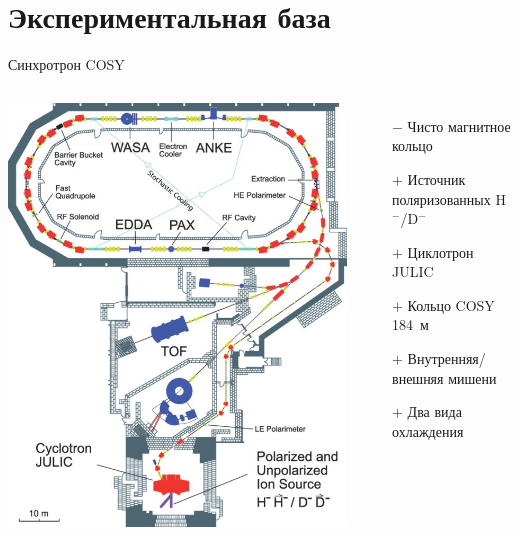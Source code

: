 \documentclass[14pt]{beamer}
\begin{document}
\section{Экспериментальная база}
\begin{frame}{Синхротрон COSY}
	\begin{columns}
		\centering
		\includegraphics[width=\linewidth]{COSY_facility}
		\begin{itemize}
			\item[$-$] Чисто магнитное кольцо
			\item[$+$] Источник поляризованных H$^-$/D$^-$
			\item[$+$] Циклотрон JULIC
			\item[$+$] Кольцо COSY 184~м
			\item[$+$] Внутренняя/внешняя мишени
			\item[$+$] Два вида охлаждения
		\end{itemize}
	\end{columns}
	
\end{frame}
\end{document}

